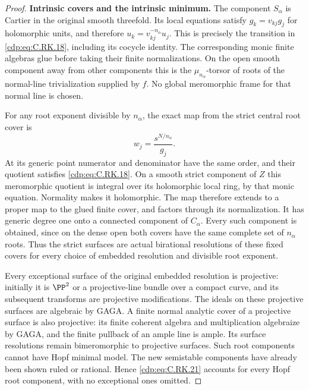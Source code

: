 \begin{proof}
\par\medskip\noindent\textbf{Intrinsic covers and the intrinsic minimum.}
The component $S_\alpha$ is Cartier
in the original smooth threefold.
Its local equations satisfy
$g_k=v_{kj}g_j$ for holomorphic
units, and therefore
$u_k=v_{kj}^{-n_\alpha}u_j$.
This is precisely the transition
in \eqref{cdp:eq:C.RK.18}, including its cocycle
identity. The corresponding monic
finite algebras glue before taking
their finite normalizations.
On the open smooth component
away from other components this
is the $\mu_{n_\alpha}$-torsor
of roots of the normal-line
trivialization supplied by $f$.
No global meromorphic frame for
that normal line is chosen.

For any root exponent divisible
by $n_\alpha$, the exact map from
the strict central root cover is
\[
                         w_j=\frac{s^{N/n_\alpha}}{g_j}.
\tag{C.RK.21}\label{cdp:eq:C.RK.21}
\]
At its generic point numerator
and denominator have the same
order, and their quotient satisfies
\eqref{cdp:eq:C.RK.18}. On a smooth strict
component of $Z$ this meromorphic
quotient is integral over its
holomorphic local ring, by that
monic equation. Normality makes
it holomorphic. The map therefore
extends to a proper map to the
glued finite cover, and factors
through its normalization. It
has generic degree one onto a
connected component of $C_\alpha$.
Every such component is obtained,
since on the dense open both
covers have the same complete
set of $n_\alpha$ roots.
Thus the strict surfaces are
actual birational resolutions
of these fixed covers for every
choice of embedded resolution
and divisible root exponent.

Every exceptional surface of
the original embedded resolution
is projective: initially it is
$\PP^2$ or a projective-line
bundle over a compact curve,
and its subsequent transforms
are projective modifications.
The ideals on these projective
surfaces are algebraic by GAGA.
A finite normal analytic cover
of a projective surface is also
projective: its finite coherent
algebra and multiplication
algebraize by GAGA, and the
finite pullback of an ample
line is ample. Its surface
resolutions remain bimeromorphic
to projective surfaces. Such
root components cannot have
Hopf minimal model. The new
semistable components have
already been shown ruled or
rational. Hence \eqref{cdp:eq:C.RK.21}
accounts for every Hopf root
component, with no exceptional
ones omitted.


\end{proof}
